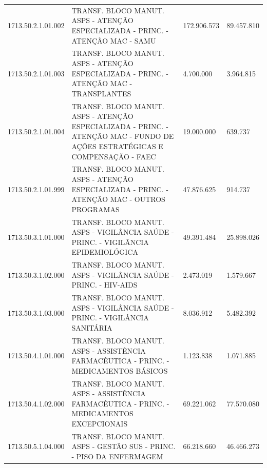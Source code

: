 \documentclass{article}
\begin{document}
\begin{longtable}[c]{m{2cm}|m{11cm}|m{2cm}m{2cm}}
\multicolumn{1}{C{2cm}|}{1713.50.2.1.01.002} & \multicolumn{1}{L{11cm}|}{TRANSF. BLOCO MANUT. ASPS - ATENÇÃO ESPECIALIZADA - PRINC. - ATENÇÃO MAC - SAMU} & \multicolumn{1}{R{2cm}|}{172.906.573} & \multicolumn{1}{R{2cm}}{89.457.810} \\
\multicolumn{1}{C{2cm}|}{1713.50.2.1.01.003} & \multicolumn{1}{L{11cm}|}{TRANSF. BLOCO MANUT. ASPS - ATENÇÃO ESPECIALIZADA - PRINC. - ATENÇÃO MAC - TRANSPLANTES} & \multicolumn{1}{R{2cm}|}{4.700.000} & \multicolumn{1}{R{2cm}}{3.964.815} \\
\multicolumn{1}{C{2cm}|}{1713.50.2.1.01.004} & \multicolumn{1}{L{11cm}|}{TRANSF. BLOCO MANUT. ASPS - ATENÇÃO ESPECIALIZADA - PRINC. - ATENÇÃO MAC - FUNDO DE AÇÕES ESTRATÉGICAS E COMPENSAÇÃO - FAEC} & \multicolumn{1}{R{2cm}|}{19.000.000} & \multicolumn{1}{R{2cm}}{639.737} \\
\multicolumn{1}{C{2cm}|}{1713.50.2.1.01.999} & \multicolumn{1}{L{11cm}|}{TRANSF. BLOCO MANUT. ASPS - ATENÇÃO ESPECIALIZADA - PRINC. - ATENÇÃO MAC - OUTROS PROGRAMAS} & \multicolumn{1}{R{2cm}|}{47.876.625} & \multicolumn{1}{R{2cm}}{914.737} \\
\multicolumn{1}{C{2cm}|}{1713.50.3.1.01.000} & \multicolumn{1}{L{11cm}|}{TRANSF. BLOCO MANUT. ASPS - VIGILÂNCIA SAÚDE - PRINC. - VIGILÂNCIA EPIDEMIOLÓGICA} & \multicolumn{1}{R{2cm}|}{49.391.484} & \multicolumn{1}{R{2cm}}{25.898.026} \\
\multicolumn{1}{C{2cm}|}{1713.50.3.1.02.000} & \multicolumn{1}{L{11cm}|}{TRANSF. BLOCO MANUT. ASPS - VIGILÂNCIA SAÚDE - PRINC. - HIV-AIDS} & \multicolumn{1}{R{2cm}|}{2.473.019} & \multicolumn{1}{R{2cm}}{1.579.667} \\
\multicolumn{1}{C{2cm}|}{1713.50.3.1.03.000} & \multicolumn{1}{L{11cm}|}{TRANSF. BLOCO MANUT. ASPS - VIGILÂNCIA SAÚDE - PRINC. - VIGILÂNCIA SANITÁRIA} & \multicolumn{1}{R{2cm}|}{8.036.912} & \multicolumn{1}{R{2cm}}{5.482.392} \\
\multicolumn{1}{C{2cm}|}{1713.50.4.1.01.000} & \multicolumn{1}{L{11cm}|}{TRANSF. BLOCO MANUT. ASPS - ASSISTÊNCIA FARMACÊUTICA - PRINC. - MEDICAMENTOS BÁSICOS} & \multicolumn{1}{R{2cm}|}{1.123.838} & \multicolumn{1}{R{2cm}}{1.071.885} \\
\multicolumn{1}{C{2cm}|}{1713.50.4.1.02.000} & \multicolumn{1}{L{11cm}|}{TRANSF. BLOCO MANUT. ASPS - ASSISTÊNCIA FARMACÊUTICA - PRINC. - MEDICAMENTOS EXCEPCIONAIS} & \multicolumn{1}{R{2cm}|}{69.221.062} & \multicolumn{1}{R{2cm}}{77.570.080} \\
\multicolumn{1}{C{2cm}|}{1713.50.5.1.04.000} & \multicolumn{1}{L{11cm}|}{TRANSF. BLOCO MANUT. ASPS - GESTÃO SUS - PRINC. - PISO DA ENFERMAGEM} & \multicolumn{1}{R{2cm}|}{66.218.660} & \multicolumn{1}{R{2cm}}{46.466.273} \\

\end{longtable}
\end{document}
